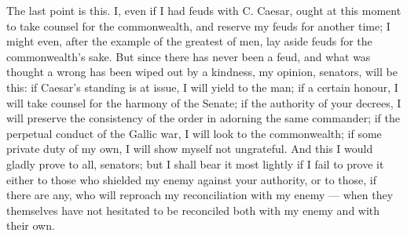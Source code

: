  The last point is this. I, even if I had feuds with C. Caesar, ought at this moment to take counsel for the commonwealth, and reserve my feuds for another time; I might even, after the example of the greatest of men, lay aside feuds for the commonwealth's sake. But since there has never been a feud, and what was thought a wrong has been wiped out by a kindness, my opinion, senators, will be this: if Caesar's standing is at issue, I will yield to the man; if a certain honour, I will take counsel for the harmony of the Senate; if the authority of your decrees, I will preserve the consistency of the order in adorning the same commander; if the perpetual conduct of the Gallic war, I will look to the commonwealth; if some private duty of my own, I will show myself not ungrateful. And this I would gladly prove to all, senators; but I shall bear it most lightly if I fail to prove it either to those who shielded my enemy against your authority, or to those, if there are any, who will reproach my reconciliation with my enemy --- when they themselves have not hesitated to be reconciled both with my enemy and with their own.
